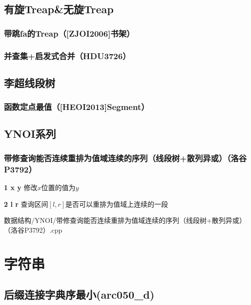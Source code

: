 \documentclass{article}
\begin{document}
\subsection{有旋Treap\&无旋Treap}
\subsubsection{带跳fa的Treap（[ZJOI2006]书架）}

\subsubsection{并查集+启发式合并（HDU3726）}


\subsection{李超线段树}
\subsubsection{函数定点最值（[HEOI2013]Segment）}



\subsection{YNOI系列}
\subsubsection{带修查询能否连续重排为值域连续的序列（线段树+散列异或）（洛谷P3792）}
\textbf{1 x y} 修改$x$位置的值为$y$\par
\textbf{2 l r} 查询区间$[l,r]$是否可以重排为值域上连续的一段\par
 {数据结构/YNOI/带修查询能否连续重排为值域连续的序列（线段树+散列异或）（洛谷P3792）.cpp}


\section{字符串}
\subsection{后缀连接字典序最小(arc050_d)}


\end{document}
